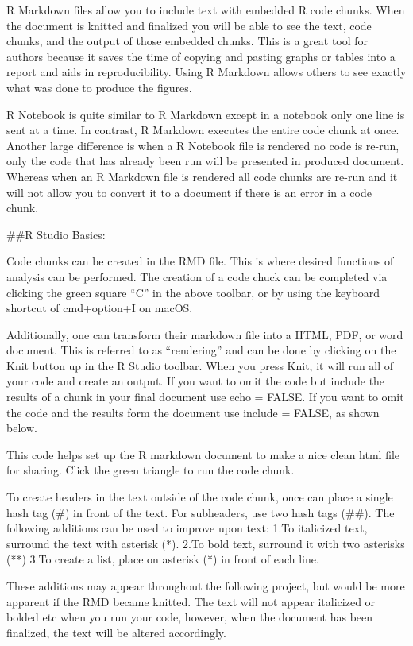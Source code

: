 \documentclass[
]{article}
\begin{document}
R Markdown files allow you to include text with embedded R code chunks.
When the document is knitted and finalized you will be able to see the
text, code chunks, and the output of those embedded chunks. This is a
great tool for authors because it saves the time of copying and pasting
graphs or tables into a report and aids in reproducibility. Using R
Markdown allows others to see exactly what was done to produce the
figures.

R Notebook is quite similar to R Markdown except in a notebook only one
line is sent at a time. In contrast, R Markdown executes the entire code
chunk at once. Another large difference is when a R Notebook file is
rendered no code is re-run, only the code that has already been run will
be presented in produced document. Whereas when an R Markdown file is
rendered all code chunks are re-run and it will not allow you to convert
it to a document if there is an error in a code chunk.

\#\#R Studio Basics:

Code chunks can be created in the RMD file. This is where desired
functions of analysis can be performed. The creation of a code chuck can
be completed via clicking the green square ``C'' in the above toolbar,
or by using the keyboard shortcut of cmd+option+I on macOS.

Additionally, one can transform their markdown file into a HTML, PDF, or
word document. This is referred to as ``rendering'' and can be done by
clicking on the Knit button up in the R Studio toolbar. When you press
Knit, it will run all of your code and create an output. If you want to
omit the code but include the results of a chunk in your final document
use echo = FALSE. If you want to omit the code and the results form the
document use include = FALSE, as shown below.

This code helps set up the R markdown document to make a nice clean html
file for sharing. Click the green triangle to run the code chunk.

To create headers in the text outside of the code chunk, once can place
a single hash tag (\#) in front of the text. For subheaders, use two
hash tags (\#\#). The following additions can be used to improve upon
text: 1.To italicized text, surround the text with asterisk (*). 2.To
bold text, surround it with two asterisks (**) 3.To create a list, place
on asterisk (*) in front of each line.

These additions may appear throughout the following project, but would
be more apparent if the RMD became knitted. The text will not appear
italicized or bolded etc when you run your code, however, when the
document has been finalized, the text will be altered accordingly.
\end{document}
